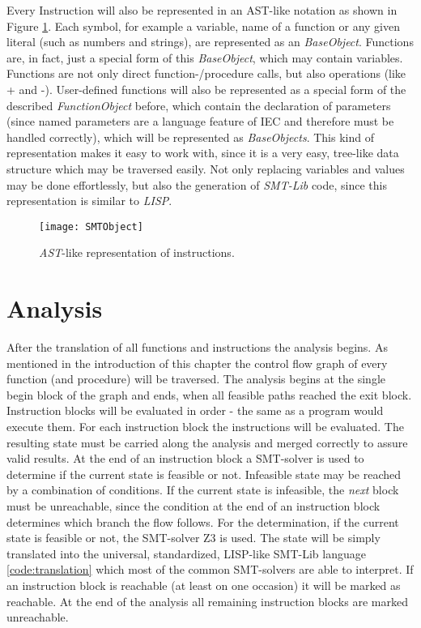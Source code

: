 Every Instruction will also be represented in an AST-like notation as shown in Figure \ref{fig:smtobject}. Each symbol, for example a variable, name of a function or any given literal (such as numbers and strings), are represented as an \emph{BaseObject}. Functions are, in fact, just a special form of this \emph{BaseObject}, which may contain variables. Functions are not only direct function-/procedure calls, but also operations (like + and -). User-defined functions will also be represented as a special form of the described \emph{FunctionObject} before, which contain the declaration of parameters (since named parameters are a language feature of IEC and therefore must be handled correctly), which will be represented as \emph{BaseObjects}. 
This kind of representation makes it easy to work with, since it is a very easy, tree-like data structure which may be traversed easily. Not only replacing variables and values may be done effortlessly, but also the generation of \emph{SMT-Lib} code, since this representation is similar to \emph{LISP}.

\begin{figure}
	\centering
	\texttt{[image: SMTObject]}
	\caption{\emph{AST}-like representation of instructions. }
	\label{fig:smtobject}
\end{figure}
\section{Analysis}
\label{sec:analysis}
After the translation of all functions and instructions the analysis begins. As mentioned in the introduction of this chapter the control flow graph of every function (and procedure) will be traversed. The analysis begins at the single begin block of the graph and ends, when all feasible paths reached the exit block. Instruction blocks will be evaluated in order - the same as a program would execute them. 
For each instruction block the instructions will be evaluated. The resulting state must be carried along the analysis and merged correctly to assure valid results. At the end of an instruction block a SMT-solver is used to determine if the current state is feasible or not. Infeasible state may be reached by a combination of conditions. If the current state is infeasible, the \emph{next} block must be unreachable, since the condition at the end of an instruction block determines which branch the flow follows. 
For the determination, if the current state is feasible or not, the SMT-solver Z3 \cite{demouraZ3EfficientSMT2008} is used. The state will be simply translated into the universal, standardized, LISP-like SMT-Lib language \ref{code:translation} which most of the common SMT-solvers are able to interpret. 
If an instruction block is reachable (at least on one occasion) it will be marked as reachable. At the end of the analysis all remaining instruction blocks are marked unreachable.

